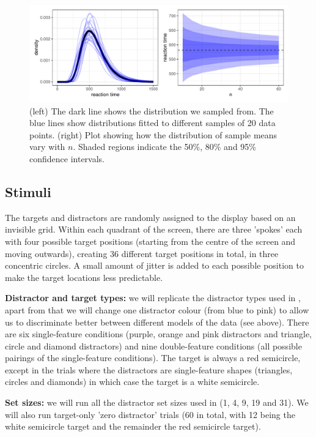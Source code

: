 \documentclass[preprint,12pt,authoryear]{elsarticle}
\begin{document}
\begin{figure}
\centering
\includegraphics[width=\textwidth]{../plots/n_trials.pdf}
\caption{(left) The dark line shows the distribution we sampled from. The blue lines show distributions fitted to different samples of 20 data points. (right) Plot showing how the distribution of sample means vary with $n$. Shaded regions indicate the 50\%, 80\% and 95\% confidence intervals.}
\label{fig:n_trials}
\end{figure}

\subsection{Stimuli}

The targets and distractors are randomly assigned to the display based on an invisible grid. Within each quadrant of the screen, there are three 'spokes' each with four possible target positions (starting from the centre of the screen and moving outwards), creating 36 different target positions in total, in three concentric circles. A small amount of jitter is added to each possible position to make the target locations less predictable.

\textbf{Distractor and target types:} we will replicate the distractor types used in \cite{buetti2019predicting}, apart from that we will change one distractor colour (from blue to pink) to allow us to discriminate better between different models of the data (see above). There are six single-feature conditions (purple, orange and pink distractors and triangle, circle and diamond distractors) and nine double-feature conditions (all possible pairings of the single-feature conditions). The target is always a red semicircle, except in the trials where the distractors are single-feature shapes (triangles, circles and diamonds) in which case the target is a white semicircle.

\textbf{Set sizes:} we will run all the distractor set sizes used in \cite{buetti2019predicting} (1, 4, 9, 19 and 31). We will also run target-only 'zero distractor' trials (60 in total, with 12 being the white semicircle target and the remainder the red semicircle target).
\end{document}
